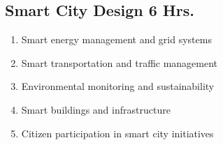 \subsection{Smart City Design \hfill{6 Hrs.}}
\begin{enumerate}
    \item Smart energy management and grid systems
    \item Smart transportation and traffic management
    \item Environmental monitoring and sustainability
    \item Smart buildings and infrastructure
    \item Citizen participation in smart city initiatives
\end{enumerate}